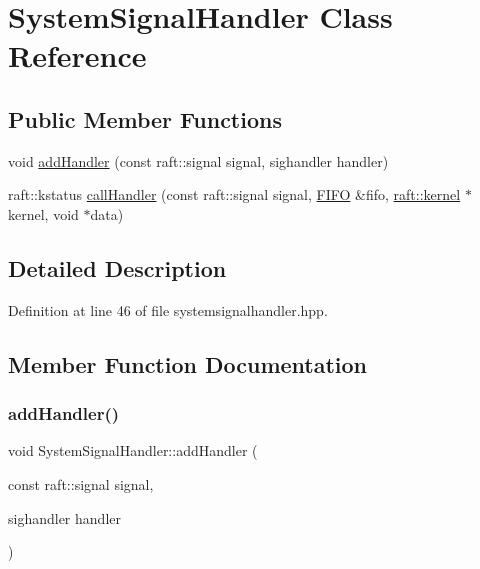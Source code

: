 \hypertarget{class_system_signal_handler}{}\section{System\+Signal\+Handler Class Reference}
\label{class_system_signal_handler}
\subsection*{Public Member Functions}
\begin{DoxyCompactItemize}
\item 
void \hyperlink{class_system_signal_handler_a50e022b8b70b7168a20e3ae91c158c70}{add\+Handler} (const raft\+::signal signal, sighandler handler)
\item 
raft\+::kstatus \hyperlink{class_system_signal_handler_ac66db8af116e4f887706e58acb0781bb}{call\+Handler} (const raft\+::signal signal, \hyperlink{class_f_i_f_o}{F\+I\+FO} \&fifo, \hyperlink{classraft_1_1kernel}{raft\+::kernel} $\ast$kernel, void $\ast$data)
\end{DoxyCompactItemize}


\subsection{Detailed Description}


Definition at line 46 of file systemsignalhandler.\+hpp.



\subsection{Member Function Documentation}
\hypertarget{class_system_signal_handler_a50e022b8b70b7168a20e3ae91c158c70}{}\label{class_system_signal_handler_a50e022b8b70b7168a20e3ae91c158c70} 
\subsubsection{\texorpdfstring{add\+Handler()}{addHandler()}}
{\footnotesize\ttfamily void System\+Signal\+Handler\+::add\+Handler (\begin{DoxyParamCaption}\item[{const raft\+::signal}]{signal,  }\item[{sighandler}]{handler }\end{DoxyParamCaption})}

